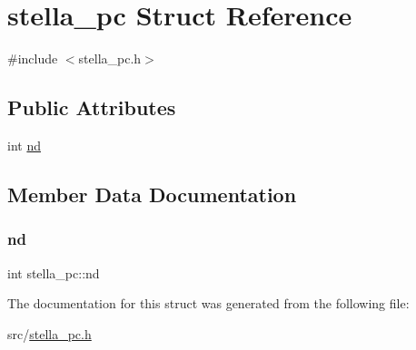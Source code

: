 \hypertarget{structstella__pc}{}\section{stella\+\_\+pc Struct Reference}
\label{structstella__pc}


{\ttfamily \#include $<$stella\+\_\+pc.\+h$>$}

\subsection*{Public Attributes}
\begin{DoxyCompactItemize}
\item 
int \mbox{\hyperlink{structstella__pc_a6808ca8eca15d16d84a0d1f72971b758}{nd}}
\end{DoxyCompactItemize}


\subsection{Member Data Documentation}
\mbox{\label{structstella__pc_a6808ca8eca15d16d84a0d1f72971b758}} 
\subsubsection{\texorpdfstring{nd}{nd}}
{\footnotesize\ttfamily int stella\+\_\+pc\+::nd}



The documentation for this struct was generated from the following file\+:\begin{DoxyCompactItemize}
\item 
src/\mbox{\hyperlink{stella__pc_8h}{stella\+\_\+pc.\+h}}\end{DoxyCompactItemize}
